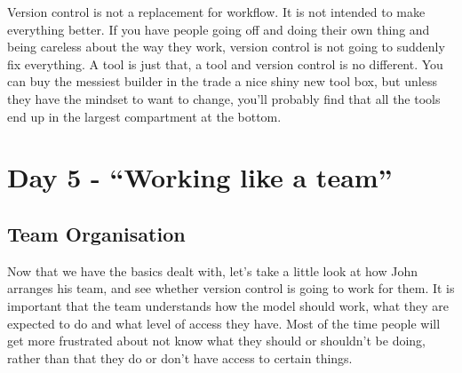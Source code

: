 Version control is not a replacement for workflow.
It is not intended to make everything better.
If you have people going off and doing their own thing and being careless about the way they work, version control is not going to suddenly fix everything.
A tool is just that, a tool and version control is no different.
You can buy the messiest builder in the trade a nice shiny new tool box, but unless they have the mindset to want to change, you'll probably find that all the tools end up in the largest compartment at the bottom.

\section{Day 5 - ``Working like a team''}

\subsection{Team Organisation}

Now that we have the basics dealt with, let's take a little look at how John arranges his team, and see whether version control is going to work for them.
It is important that the team understands how the model should work, what they are expected to do and what level of access they have.
Most of the time people will get more frustrated about not know what they should or shouldn't be doing, rather than that they do or don't have access to certain things.

